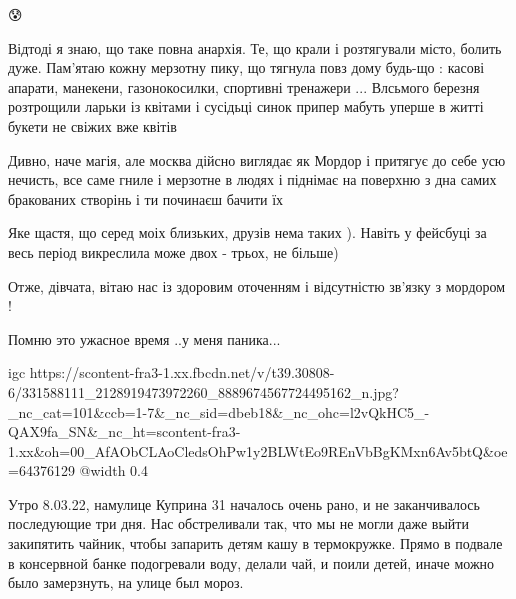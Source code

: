  
 
 
 
 

\qqSecCmt

😰🙏


Відтоді я знаю, що таке повна анархія. Те, що крали і розтягували місто, болить
дуже. Пам'ятаю кожну мерзотну пику, що тягнула повз дому будь-що :
касові апарати, манекени, газонокосилки, спортивні тренажери ... Влсьмого
березня розтрощили ларьки із квітами і сусідьці синок припер мабуть уперше в
житті букети не свіжих вже квітів

Дивно, наче магія, але москва дійсно виглядає як Мордор і притягує до себе усю
нечисть, все саме гниле і мерзотне в людях і піднімає на поверхню з дна самих
бракованих створінь і ти починаєш бачити їх

Яке щастя, що серед моіх близьких, друзів нема таких ). Навіть у фейсбуці за
весь період викреслила може двох - трьох, не більше)

Отже, дівчата, вітаю нас із здоровим оточенням і відсутністю зв'язку з мордором !


Помню это ужасное время ..у меня паника...

\ifcmt
  igc https://scontent-fra3-1.xx.fbcdn.net/v/t39.30808-6/331588111_2128919473972260_8889674567724495162_n.jpg?_nc_cat=101&ccb=1-7&_nc_sid=dbeb18&_nc_ohc=l2vQkHC5_-QAX9fa_SN&_nc_ht=scontent-fra3-1.xx&oh=00_AfAObCLAoCledsOhPw1y2BLWtEo9REnVbBgKMxn6Av5btQ&oe=64376129
	@width 0.4
\fi


Утро 8.03.22, намулице Куприна 31 началось очень рано, и не заканчивалось
последующие три дня. Нас обстреливали так, что мы не могли даже выйти
закипятить чайник, чтобы запарить детям кашу в термокружке. Прямо в подвале в
консервной банке подогревали воду, делали чай, и поили детей, иначе можно
было замерзнуть, на улице был мороз.

